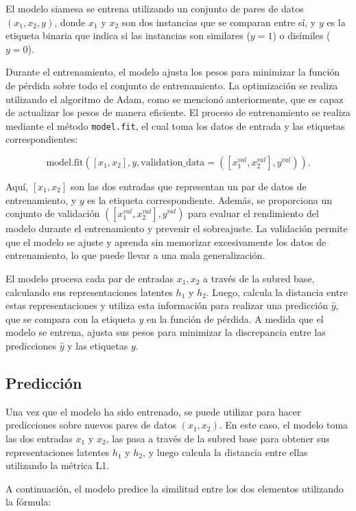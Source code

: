 El modelo siamesa se entrena utilizando un conjunto de pares de datos \( (x_1, x_2, y) \), donde \( x_1 \) y \( x_2 \) son dos instancias que se comparan entre sí, y \( y \) es la etiqueta binaria que indica si las instancias son similares (\(y = 1\)) o disímiles (\(y = 0\)).

Durante el entrenamiento, el modelo ajusta los pesos para minimizar la función de pérdida sobre todo el conjunto de entrenamiento. La optimización se realiza utilizando el algoritmo de Adam, como se mencionó anteriormente, que es capaz de actualizar los pesos de manera eficiente. El proceso de entrenamiento se realiza mediante el método \texttt{model.fit}, el cual toma los datos de entrada y las etiquetas correspondientes:

\[
\text{model.fit}([x_1, x_2], y, \text{validation\_data}=([x_1^{val}, x_2^{val}], y^{val})).
\]

Aquí, \( [x_1, x_2] \) son las dos entradas que representan un par de datos de entrenamiento, y \( y \) es la etiqueta correspondiente. Además, se proporciona un conjunto de validación \( ([x_1^{val}, x_2^{val}], y^{val}) \) para evaluar el rendimiento del modelo durante el entrenamiento y prevenir el sobreajuste. La validación permite que el modelo se ajuste y aprenda sin memorizar excesivamente los datos de entrenamiento, lo que puede llevar a una mala generalización.

El modelo procesa cada par de entradas \( x_1, x_2 \) a través de la subred base, calculando sus representaciones latentes \( h_1 \) y \( h_2 \). Luego, calcula la distancia entre estas representaciones y utiliza esta información para realizar una predicción \( \hat{y} \), que se compara con la etiqueta \( y \) en la función de pérdida. A medida que el modelo se entrena, ajusta sus pesos para minimizar la discrepancia entre las predicciones \( \hat{y} \) y las etiquetas \( y \).

\subsection{Predicción}

Una vez que el modelo ha sido entrenado, se puede utilizar para hacer predicciones sobre nuevos pares de datos \( (x_1, x_2) \). En este caso, el modelo toma las dos entradas \( x_1 \) y \( x_2 \), las pasa a través de la subred base para obtener sus representaciones latentes \( h_1 \) y \( h_2 \), y luego calcula la distancia entre ellas utilizando la métrica L1.

A continuación, el modelo predice la similitud entre los dos elementos utilizando la fórmula:

